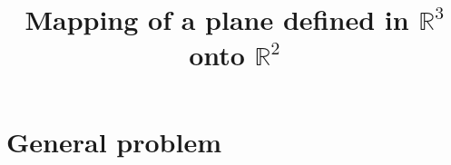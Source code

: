 \documentclass[a4paper,10pt]{article}
\begin{document}
\newcommand{\azul}[1]{{\color{blue}{#1}}}
\newcommand{\rojo}[1]{{\color{red}{#1}}}
\newcommand{\naranja}[1]{{\color{orange}{#1}}}
\newcommand{\negro}[1]{{\color{black}{#1}}}
\newcommand{\rojoneg}[1]{{\bf \color{red}{#1}}}
\newcommand{\verde}[1]{{\color{green}{#1}}}
\newcommand{\verdeoscuro}[1]{{\color{verdeoliva}{#1}}}
\newcommand{\gray}[1]{{\color{gris}{#1}}}

\newcommand{\be}{\begin{equation}}
\newcommand{\ee}{\end{equation}}
\newcommand{\baa}{\begin{eqnarray}}
\newcommand{\eaa}{\end{eqnarray}}
\newcommand{\drvd}[1]{\frac{d}{d #1}}
\newcommand{\drvdd}[2]{\frac{d #1}{d #2}}
\newcommand{\prtd}[1]{\frac{\partial}{\partial #1}}
\newcommand{\prtdd}[2]{\frac{\partial #1}{\partial #2}}

\newcommand{\atm}{\mbox{atm}}
\newcommand{\atmL}{\mbox{atm L}}
\newcommand{\bv}{{\, | \,}}
\newcommand{\caloria }{\mbox{cal}}
\newcommand{\chibar}{\overline{\chi}}
\newcommand{\chine}{\boldsymbol{\chi}}
\newcommand{\cne}{\mathbf{c}}
\newcommand{\fcal}{\mathcal{f}}
\newcommand{\fnecal}{\mathbcal{f}}
\newcommand{\fem}{\mathscr{E}}
\newcommand{\Fbar}{\tilde{\Fcal}}
\newcommand{\Fcal}{\mathscr{F}}
\newcommand{\Ine}{\mathbf{I}}
\newcommand{\Jbar}{\tilde{J}}
\newcommand{\la}{{\langle \, }}
\newcommand{\Ncal}{{\cal{N}}}
\newcommand{\Pcal}{\mathscr{P}}
\newcommand{\qne}{\mathbf{q}}
\newcommand{\ra}{{\, \rangle}}
\newcommand{\Rcal}{\mathcal{R}}
\newcommand{\Rbar}{\tilde{\Rcal}}
\newcommand{\rne}{\mathbf{r}}
\newcommand{\Rnecal}{\mathbcal{R}}
\newcommand{\Rotcal}{\mathcal{D}}
\newcommand{\Rotcalne}{{\mathbcal D}}
\newcommand{\rstar}{{r^*}}
\newcommand{\tne}{\mathbf{t}}
\newcommand{\Zbar}{\tilde{Z}}
\newcommand{\Zne}{\mathbf{Z}}
\newcommand{\Zcal}{\mathcal{Z}}
\newcommand{\Znecal}{\mathbfcal{Z}}

\renewcommand{\baselinestretch}{1.25}

\title{Mapping of a plane defined in $\mathbb{R}^3$ onto $\mathbb{R}^2$}


\maketitle

\section{General problem}
\end{document}
